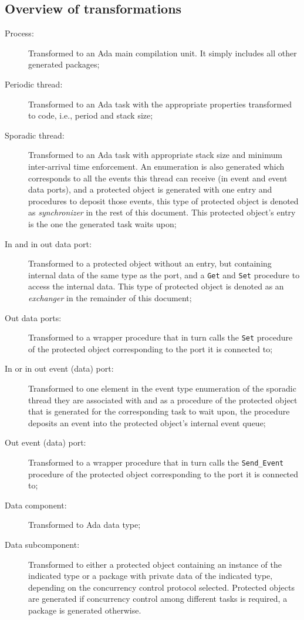\subsection{Overview of transformations}
\begin{description}
\item[Process:]{Transformed to an Ada main compilation unit. It simply
  includes all other generated packages;}
\item[Periodic thread:]{Transformed to an Ada task with the
  appropriate properties transformed to code, i.e., period and stack
  size;}
\item[Sporadic thread:]{Transformed to an Ada task with appropriate
  stack size and minimum inter-arrival time enforcement. An
  enumeration is also generated which corresponds to all the events
  this thread can receive (in event and event data ports), and a
  protected object is generated with one entry and procedures to
  deposit those events, this type of protected object is denoted as
  \emph{synchronizer} in the rest of this document. This protected
  object's entry is the one the generated task waits upon;}
\item[In and in out data port:]{Transformed to a protected object
  without an entry, but containing internal data of the same type as
  the port, and a \texttt{Get} and \texttt{Set} procedure to access
  the internal data. This type of protected object is denoted as an
  \emph{exchanger} in the remainder of this document;}
\item[Out data ports:]{Transformed to a wrapper procedure that in turn
  calls the \texttt{Set} procedure of the protected object
  corresponding to the port it is connected to;}
\item[In or in out event (data) port:]{Transformed to one element in the
  event type enumeration of the sporadic thread they are associated
  with and as a procedure of the protected object that is generated
  for the corresponding task to wait upon, the procedure deposits an
  event into the protected object's internal event queue;}
\item[Out event (data) port:]{Transformed to a wrapper procedure that
  in turn calls the \texttt{Send\_Event} procedure of the protected
  object corresponding to the port it is connected to;}
\item[Data component:]{Transformed to Ada data type;}
\item[Data subcomponent:]{Transformed to either a protected object
  containing an instance of the indicated type or a package with
  private data of the indicated type, depending on the concurrency
  control protocol selected. Protected objects are generated if
  concurrency control among different tasks is required, a package is
  generated otherwise.}
\end{description}

